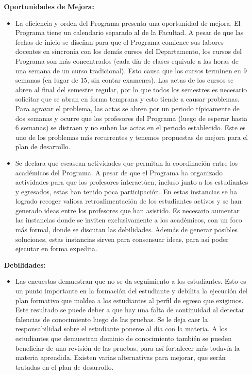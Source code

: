 \noindent\textbf{Oportunidades de Mejora:}

\begin{itemize}
\item La eficiencia y orden del Programa presenta una oportunidad de mejora. El Programa tiene un calendario separado al de la Facultad. A pesar
de que las fechas de inicio se diseñan para que el Programa comience sus labores docentes en sincronía con los demás cursos del Departamento, 
los cursos del Programa son más concentrados (cada día de clases equivale a las horas de una semana de un curso tradicional). Esto causa que 
los cursos terminen en 9 semanas (en lugar de 15, sin contar examenes). Las actas de los cursos se abren al final del semestre regular, por lo que todos los 
semestres es necesario solicitar que se abran en forma temprana y esto tiende a causar problemas. Para agravar el problema, las actas se abren por 
un periodo típicamente de dos semanas y ocurre que los profesores del Programa (luego de esperar hasta 6 semanas) se distraen y no suben las actas 
en el periodo establecido. Este es uno de los problemas más recurrentes y tenemos propuestas de mejora para el plan de desarrollo.
\item Se declara que escasean actividades que permitan la coordinación entre los académicos del Programa. A pesar de que el Programa 
ha organizado actividades para que los profesores interactúen, incluso junto a los estudiantes y egresados, estas han tenido poca 
participación. En estas instancias se ha logrado recoger valiosa retroalimentación de los estudiantes activos y 
se han generado ideas entre los profesores que han asistido. Es necesario aumentar las instancias donde se inviten exclusivamente a los académicos, con un foco
más formal, donde se discutan las debilidades. Además de generar posibles soluciones, estas instancias sirven para consensuar ideas, para así 
poder ejecutar en forma expedita.
\end{itemize}



\noindent\textbf{Debilidades:}

\begin{itemize}
\item Las encuestas demuestran que no se da seguimiento a los estudiantes. Esto es un punto importante en la formación del estudiante
y debilita la ejecución del plan formativo que moldea a los estudiantes al perfil de egreso que exigimos. Este resultado se puede deber a que 
hay una falta de continuidad al detectar falencias de conocimiento luego de las pruebas. Se le deja caer la responsabilidad sobre el 
estudiante ponerse al día con la materia. A los estudiantes que demuestran dominio de conocimiento también se pueden beneficiar de
una revisión de las pruebas, para así fortalecer más todavía la materia aprendida. Existen varias alternativas 
para mejorar, que serán tratadas en el plan de desarrollo.
\end{itemize}



